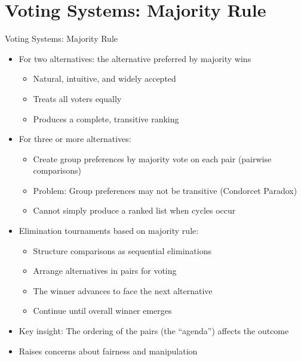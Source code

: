 \documentclass[10pt,handout]{beamer}
\begin{document}
\section{Voting Systems: Majority Rule}

\begin{frame}{Voting Systems: Majority Rule}
  \begin{itemize}[<+->]
    \item For two alternatives: the alternative preferred by majority wins
      \begin{itemize}
        \item Natural, intuitive, and widely accepted
        \item Treats all voters equally
        \item Produces a complete, transitive ranking
      \end{itemize}
    \item For three or more alternatives:
      \begin{itemize}
        \item Create group preferences by majority vote on each pair (pairwise comparisons)
        \item Problem: Group preferences may not be transitive (Condorcet Paradox)
        \item Cannot simply produce a ranked list when cycles occur
      \end{itemize}
    \item Elimination tournaments based on majority rule:
      \begin{itemize}
        \item Structure comparisons as sequential eliminations
        \item Arrange alternatives in pairs for voting
        \item The winner advances to face the next alternative
        \item Continue until overall winner emerges
      \end{itemize}
    \item Key insight: The ordering of the pairs (the ``agenda'') affects the outcome
    \item Raises concerns about fairness and manipulation
  \end{itemize}
\end{frame}
\end{document}
